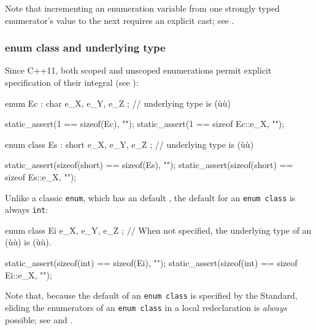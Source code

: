 \noindent Note that incrementing an enumeration variable from one strongly typed
enumerator's value to the next requires an explicit cast; see .

\subsubsection[\lstinline!enum! \lstinline!class! and underlying type]{{\SubsubsecCode enum} {\SubsubsecCode class} and underlying type}\label{enum-class-and-underlying-type}

Since C++11, both scoped and unscoped enumerations permit explicit
specification of their integral  (see ):

\begin{emcppslisting}
enum Ec : char { e_X, e_Y, e_Z };
    // underlying type is (ù{}ù)

static_assert(1 == sizeof(Ec),     "");
static_assert(1 == sizeof Ec::e_X, "");

enum class Es : short { e_X, e_Y, e_Z };
    // underlying type is (ù{}ù)

static_assert(sizeof(short) == sizeof(Es),     "");
static_assert(sizeof(short) == sizeof Es::e_X, "");
\end{emcppslisting}

\noindent Unlike a classic \lstinline!enum!, which has an
 default , the
default  for an \lstinline!enum!~\lstinline!class! is
always \lstinline!int!:

\begin{emcppslisting}
enum class Ei { e_X, e_Y, e_Z };
    // When not specified, the underlying type of an (ù{}ù) is (ù{}ù).

static_assert(sizeof(int) == sizeof(Ei),     "");
static_assert(sizeof(int) == sizeof Ei::e_X, "");
\end{emcppslisting}

\noindent Note that, because the default  of an
\lstinline!enum!~\lstinline!class! is specified by the Standard, eliding the
enumerators of an \lstinline!enum!~\lstinline!class! in
a local redeclaration is \emph{always} possible; see  and .

